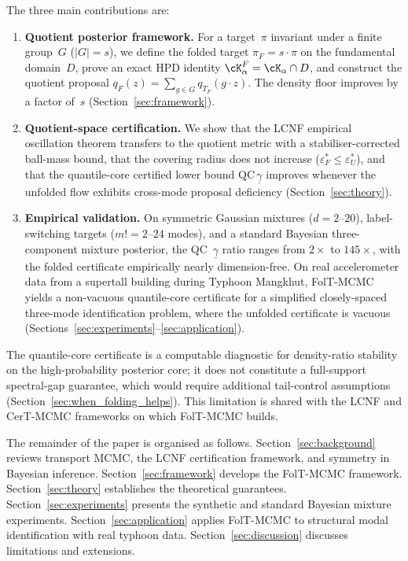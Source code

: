 The three main contributions are:
\begin{enumerate}[nosep]
  \item \textbf{Quotient posterior framework.}
  For a target~$\pi$ invariant under a finite group~$G$ ($|G|=s$),
  we define the folded target $\pi_F = s \cdot \pi$ on the
  fundamental domain~$D$, prove an exact HPD identity
  $\cK_\alpha^F = \cK_\alpha \cap D$, and construct the
  quotient proposal $q_F(z) = \sum_{g \in G} q_{T_F}(g \cdot z)$.
  The density floor improves by a factor of~$s$
  (Section~\ref{sec:framework}).

  \item \textbf{Quotient-space certification.}
  We show that the LCNF empirical oscillation theorem transfers
  to the quotient metric with a stabiliser-corrected ball-mass
  bound, that the covering radius does not increase
  ($\varepsilon_F^* \leq \varepsilon_U^*$), and that the
  quantile-core certified lower bound
  $\mathrm{QC}\,\underline{\gamma}$ improves whenever the unfolded
  flow exhibits cross-mode proposal deficiency
  (Section~\ref{sec:theory}).

  \item \textbf{Empirical validation.}
  On symmetric Gaussian mixtures ($d = 2$--$20$),
  label-switching targets ($m! = 2$--$24$ modes), and a standard
  Bayesian three-component mixture posterior, the
  QC~$\underline{\gamma}$ ratio ranges from $2\times$ to
  $145\times$, with the folded certificate empirically nearly
  dimension-free.  On real accelerometer data from a supertall
  building during Typhoon Mangkhut, FolT-MCMC yields a
  non-vacuous quantile-core certificate for a simplified
  closely-spaced three-mode identification problem, where the
  unfolded certificate is vacuous
  (Sections~\ref{sec:experiments}--\ref{sec:application}).
\end{enumerate}

\noindent
The quantile-core certificate is a computable diagnostic for
density-ratio stability on the high-probability posterior core; it
does not constitute a full-support spectral-gap guarantee, which
would require additional tail-control assumptions
(Section~\ref{sec:when_folding_helps}).  This limitation is shared
with the LCNF and CerT-MCMC frameworks on which FolT-MCMC builds.

The remainder of the paper is organised as follows.
Section~\ref{sec:background} reviews transport MCMC, the LCNF
certification framework, and symmetry in Bayesian inference.
Section~\ref{sec:framework} develops the FolT-MCMC framework.
Section~\ref{sec:theory} establishes the theoretical guarantees.
Section~\ref{sec:experiments} presents the synthetic and standard
Bayesian mixture experiments.
Section~\ref{sec:application} applies FolT-MCMC to structural
modal identification with real typhoon data.
Section~\ref{sec:discussion} discusses limitations and extensions.
